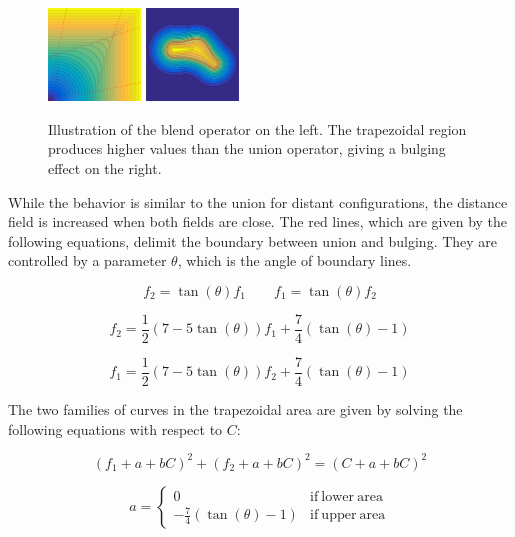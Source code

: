 \documentclass[a4paper,10pt]{article}
\begin{document}
\begin{multicols}{2}
\begin{figure}[H]
\centering
\includegraphics[width=0.22\textwidth]{figs/blend_field}
\hfill
\includegraphics[width=0.22\textwidth]{figs/blend_finger}
\caption{Illustration of the blend operator on the left.
The trapezoidal region produces higher values than the union operator, giving a bulging effect on the right.}
\label{fig:blendop}
\end{figure}

While the behavior is similar to the union for distant configurations, the distance field is increased when both fields are close.
The red lines, which are given by the following equations, delimit the boundary between union and bulging.
They are controlled by a parameter $\theta$, which is the angle of boundary lines.

\begin{equation*}
f_2 = \tan(\theta)f_1 \qquad f_1 = \tan(\theta)f_2
\end{equation*}

\begin{equation*}
f_2 = \frac{1}{2} (7 - 5\tan(\theta))f_1 + \frac{7}{4} (\tan(\theta) - 1)
\end{equation*}

\begin{equation*}
f_1 = \frac{1}{2} (7 - 5\tan(\theta))f_2 + \frac{7}{4} (\tan(\theta) - 1)
\end{equation*}

The two families of curves in the trapezoidal area are given by solving the following equations with respect to $C$:

\begin{equation*}
(f_1 + a + bC)^2 + (f_2 + a + bC)^2 = (C + a + bC)^2
\end{equation*}

\begin{equation*}
a = \left\{ \begin{array}{ll}
  0 & \mathrm{if\ lower\ area} \\
  -\frac{7}{4} (\tan(\theta) - 1) & \mathrm{if\ upper\ area}
\end{array} \right.
\end{equation*}


\end{multicols}
\end{document}
